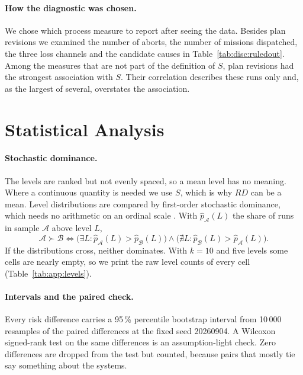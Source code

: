 \paragraph{How the diagnostic was chosen.} We chose which process measure to
report after seeing the data. Besides plan revisions we examined the number of
aborts, the number of missions dispatched, the three loss channels and the
candidate causes in Table~\ref{tab:disc:ruledout}. Among the measures that are
not part of the definition of $S$, plan revisions had the strongest
association with $S$. Their correlation describes these runs only and, as the
largest of several, overstates the association.

\section{Statistical Analysis}
\label{sec:eval:analysis}

\paragraph{Stochastic dominance.} The levels are ranked but not evenly
spaced, so a mean level has no meaning. Where a continuous quantity is needed
we use $S$, which is why $RD$ can be a mean. Level distributions are compared
by first-order stochastic dominance, which needs no arithmetic on an ordinal
scale \parencite{yalonetzky2013}. With
$\hat p_{\mathcal A}(L)$ the share of runs in sample $\mathcal A$ above level
$L$,
\begin{equation}
\mathcal A \succ \mathcal B \iff
\big(\exists L : \hat p_{\mathcal A}(L) > \hat p_{\mathcal B}(L)\big)
\wedge
\big(\nexists L : \hat p_{\mathcal B}(L) > \hat p_{\mathcal A}(L)\big).
\label{eq:eval:dominance}
\end{equation}
If the distributions cross, neither dominates. With $k = 10$ and five levels
some cells are nearly empty, so we print the raw level counts of every cell
(Table~\ref{tab:app:levels}).

\paragraph{Intervals and the paired check.} Every risk difference carries a
95\,\% percentile bootstrap interval \parencite{efron1979} from 10\,000
resamples of the paired differences at the fixed seed 20260904. A Wilcoxon
signed-rank test \parencite{wilcoxon1945} on the same differences is an
assumption-light check. Zero differences are dropped from the test but
counted, because pairs that mostly tie say something about the systems.

